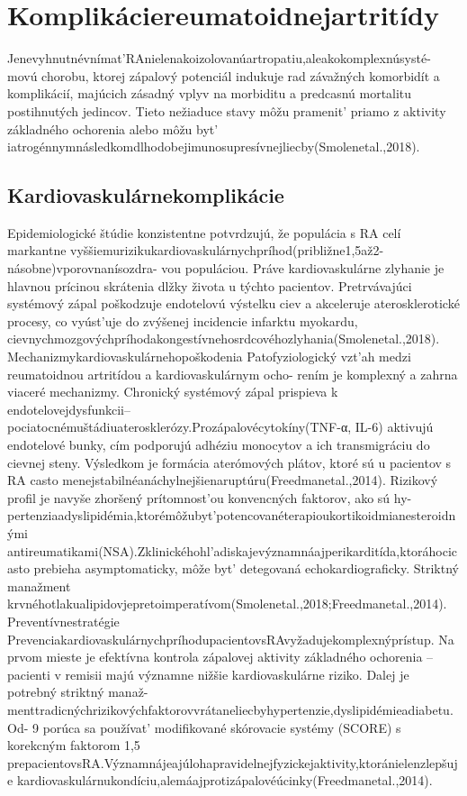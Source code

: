 \section{Komplikáciereumatoidnejartritídy}

Jenevyhnutnévnímat’RAnielenakoizolovanúartropatiu,aleakokomplexnúsysté- movú chorobu, ktorej zápalový potenciál indukuje rad závažných komorbidít a komplikácií, majúcich zásadný vplyv na morbiditu a predcasnú mortalitu postihnutých jedincov. Tieto nežiaduce stavy môžu pramenit’ priamo z aktivity základného ochorenia alebo môžu byt’ iatrogénnymnásledkomdlhodobejimunosupresívnejliecby(Smolenetal.,2018).


\subsection{Kardiovaskulárnekomplikácie}

Epidemiologické štúdie konzistentne potvrdzujú, že populácia s RA celí markantne vyššiemurizikukardiovaskulárnychpríhod(približne1,5až2-násobne)vporovnanísozdra- vou populáciou. Práve kardiovaskulárne zlyhanie je hlavnou prícinou skrátenia dlžky života u týchto pacientov. Pretrvávajúci systémový zápal poškodzuje endotelovú výstelku ciev a akceleruje aterosklerotické procesy, co vyúst’uje do zvýšenej incidencie infarktu myokardu, cievnychmozgovýchpríhodakongestívnehosrdcovéhozlyhania(Smolenetal.,2018). Mechanizmykardiovaskulárnehopoškodenia Patofyziologický vzt’ah medzi reumatoidnou artritídou a kardiovaskulárnym ocho- rením je komplexný a zahrna viaceré mechanizmy. Chronický systémový zápal prispieva k endotelovejdysfunkcii--pociatocnémuštádiuaterosklerózy.Prozápalovécytokíny(TNF-α, IL-6) aktivujú endotelové bunky, cím podporujú adhéziu monocytov a ich transmigráciu do cievnej steny. Výsledkom je formácia aterómových plátov, ktoré sú u pacientov s RA casto menejstabilnéanáchylnejšienaruptúru(Freedmanetal.,2014). Rizikový profil je navyše zhoršený prítomnost’ou konvencných faktorov, ako sú hy- pertenziaadyslipidémia,ktorémôžubyt’potencovanéterapioukortikoidmianesteroidnými antireumatikami(NSA).Zklinickéhohl’adiskajevýznamnáajperikarditída,ktoráhocicasto prebieha asymptomaticky, môže byt’ detegovaná echokardiograficky. Striktný manažment krvnéhotlakualipidovjepretoimperatívom(Smolenetal.,2018;Freedmanetal.,2014). Preventívnestratégie PrevenciakardiovaskulárnychpríhodupacientovsRAvyžadujekomplexnýprístup. Na prvom mieste je efektívna kontrola zápalovej aktivity základného ochorenia -- pacienti v remisii majú významne nižšie kardiovaskulárne riziko. Dalej je potrebný striktný manaž- menttradicnýchrizikovýchfaktorovvrátaneliecbyhypertenzie,dyslipidémieadiabetu.Od- 9 porúca sa používat’ modifikované skórovacie systémy (SCORE) s korekcným faktorom 1,5 prepacientovsRA.Významnájeajúlohapravidelnejfyzickejaktivity,ktoránielenzlepšuje kardiovaskulárnukondíciu,alemáajprotizápalovéúcinky(Freedmanetal.,2014).


